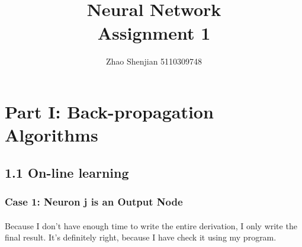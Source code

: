 \documentclass[a4paper,12pt]{article}
\title{	
\normalfont \normalsize \vspace{-13em} %
\horrule{1pt} \\[0.5cm] %
\huge Neural Network
\\ %
\vspace{1em}
\large Assignment 1
\horrule{2pt} \\[0.5cm] %
}
\author{Zhao Shenjian 5110309748}
\date{}
\begin{document}
   
\maketitle
\thispagestyle{empty}
\setcounter{page}{1}
\section*{Part I: Back-propagation Algorithms}
  \subsection*{1.1 On-line learning} 
  \subsubsection*{Case 1: Neuron j is an Output Node} 
  \paragraph{} Because I don't have enough time to write the entire derivation, I only write the final result. It's definitely right, because I have check
  it using my program.\\
\end{document}
